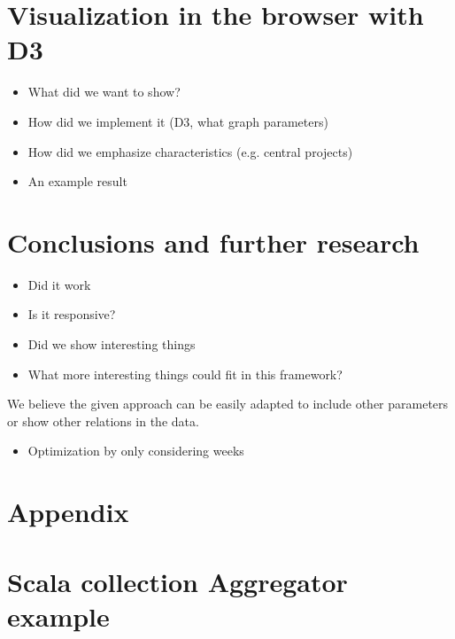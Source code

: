 \documentclass[10pt,a4paper]{article}
\renewcommand\appendix{\par
\setcounter{section}{0}%
\setcounter{subsection}{0}%
\setcounter{table}{0}
\setcounter{figure}{0}
\setcounter{equation}{0}
\gdef\thetable{\Alph{table}}
\gdef\thefigure{\Alph{figure}}
\gdef\theequation{\Alph{section}-\arabic{equation}}
\section*{Appendix}
\gdef\thesection{\Alph{section}}
\setcounter{section}{0}}
\begin{document}
\section{Visualization in the browser with D3}\label{sec:visualization}

\begin{itemize}
    \item What did we want to show?
    \item How did we implement it (D3, what graph parameters)
    \item How did we emphasize characteristics (e.g. central projects)
    \item An example result
\end{itemize}

\section{Conclusions and further research}\label{sec:conclusions}

\begin{itemize}
    \item Did it work
    \item Is it responsive?
    \item Did we show interesting things
    \item What more interesting things could fit in this framework?
\end{itemize}

We believe the given approach can be easily adapted to include other parameters or show other relations in the data.

\begin{itemize}
    \item Optimization by only considering weeks
\end{itemize}




\appendix

\section{Scala collection Aggregator example}
\end{document}
